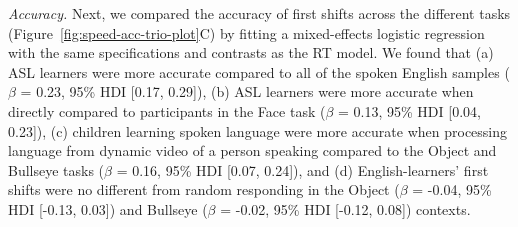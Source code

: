 \documentclass[oneside]{report}
\begin{document}
\emph{Accuracy.} Next, we compared the accuracy of first shifts across
the different tasks (Figure~\ref{fig:speed-acc-trio-plot}C) by fitting a
mixed-effects logistic regression with the same specifications and
contrasts as the RT model. We found that (a) ASL learners were more
accurate compared to all of the spoken English samples (\(\beta\) =
0.23, 95\% HDI {[}0.17, 0.29{]}), (b) ASL learners were more accurate
when directly compared to participants in the Face task (\(\beta\) =
0.13, 95\% HDI {[}0.04, 0.23{]}), (c) children learning spoken language
were more accurate when processing language from dynamic video of a
person speaking compared to the Object and Bullseye tasks (\(\beta\) =
0.16, 95\% HDI {[}0.07, 0.24{]}), and (d) English-learners' first shifts
were no different from random responding in the Object (\(\beta\) =
-0.04, 95\% HDI {[}-0.13, 0.03{]}) and Bullseye (\(\beta\) = -0.02, 95\%
HDI {[}-0.12, 0.08{]}) contexts.
\end{document}
